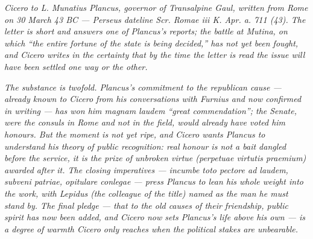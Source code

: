 
\textit{Cicero to L. Munatius Plancus, governor of Transalpine
Gaul, written from Rome on 30 March 43 BC --- Perseus dateline
\textit{Scr. Romae iii K. Apr. a. 711 (43)}. The letter is short
and answers one of Plancus's reports; the battle at Mutina, on
which ``the entire fortune of the state is being decided,'' has
not yet been fought, and Cicero writes in the certainty that by
the time the letter is read the issue will have been settled
one way or the other.}

\textit{The substance is twofold. Plancus's commitment to the
republican cause --- already known to Cicero from his
conversations with Furnius and now confirmed in writing --- has
won him \textit{magnam laudem} ``great commendation''; the
Senate, were the consuls in Rome and not in the field, would
already have voted him honours. But the moment is not yet ripe,
and Cicero wants Plancus to understand his theory of public
recognition: real honour is not a bait dangled before the
service, it is the prize of unbroken virtue (\textit{perpetuae
virtutis praemium}) awarded after it. The closing imperatives
--- \textit{incumbe toto pectore ad laudem, subveni patriae,
opitulare conlegae} --- press Plancus to lean his whole weight
into the work, with Lepidus (the colleague of the title) named
as the man he must stand by. The final pledge --- that to the
old causes of their friendship, public spirit has now been added,
and Cicero now sets Plancus's life above his own --- is a degree
of warmth Cicero only reaches when the political stakes are
unbearable.}

